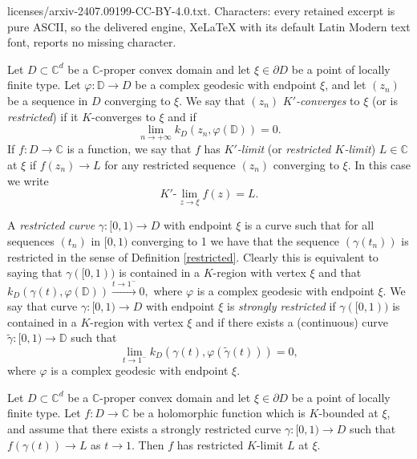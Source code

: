 \documentclass[10pt,a4paper]{amsart}
\newcommand{\C}{\mathbb{C}}
\newcommand{\D}{\mathbb{D}}
\begin{document}
licenses/arxiv-2407.09199-CC-BY-4.0.txt. Characters: every retained excerpt is pure ASCII, so the delivered engine, XeLaTeX with its default Latin Modern text font, reports no missing character.
		\begin{definition}\label{restricted}
			Let $D\subset\C^d$ be a $\C$-proper convex domain and let $\xi\in\partial D$ be a point of locally finite type. Let $\varphi\colon\D\to D$ be a complex geodesic  with endpoint $\xi$, and let  $(z_n)$ be a sequence in $D$ converging to $\xi$.
			We say that  $(z_n)$  {\sl $K'$-converges} to $\xi$ (or is  {\sl restricted}) if it $K$-converges to $\xi$ and if
			\begin{equation}\label{eqrestricted}
				\lim_{n\to+\infty}k_D(z_n,\varphi(\D))=0.
			\end{equation}
			If $f\colon D\to\C$ is a function, we say that  $f$ has  {\sl $K'$-limit} (or {\sl restricted $K$-limit})  $L\in\C$ at $\xi$  if $f(z_n)\to L$ for any restricted sequence $(z_n)$ converging to $\xi$. In this case we write
			$$K'\textrm{-}\lim_{z\to\xi}f(z)=L.$$
		\end{definition}

		\begin{definition}
			A {\sl restricted curve} $\gamma:[0,1)\to D$ with endpoint $\xi$ is a curve such that for all sequences $(t_n)$ in $[0,1)$ converging to 1 we have that the  sequence $(\gamma(t_n))$ is restricted in the sense of Definition \ref{restricted}.
			Clearly this is equivalent to saying that $\gamma([0,1))$ is contained in a $K$-region with vertex $\xi$ and that $k_D(\gamma(t),\varphi(\D))\stackrel{t\to 1^-}\longrightarrow 0,$ where $\varphi$ is a complex geodesic with endpoint $\xi$.
			We say that  curve  $\gamma:[0,1)\to D$ with endpoint $\xi$ is {\sl strongly restricted} if $\gamma([0,1))$  is contained in a $K$-region with vertex $\xi$ and if there exists a (continuous) curve $\tilde \gamma\colon [0,1)\to \D$ such that
			\begin{equation}\label{stronglyrestricted}\lim_{t\to1^-}k_D(\gamma(t),\varphi(\tilde \gamma(t)))=0,
			\end{equation}
			where $\varphi$ is a complex geodesic with endpoint $\xi$.
		\end{definition}

		\begin{theorem}\label{localLindelof}
			Let $D\subset\C^d$ be a $\C$-proper  convex domain and let $\xi\in\partial D$ be a point of locally finite type. Let $f\colon D\to \C$  be a holomorphic function which is $K$-bounded at $\xi$, and assume that there exists a strongly restricted curve $\gamma\colon[0,1)\to D$  such that $f(\gamma(t))\to L$ as $t\to 1$. Then $f$ has restricted $K$-limit $L$ at $\xi$.
		\end{theorem}
\end{document}
